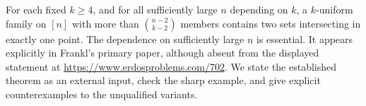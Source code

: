 For each fixed \(k\geq4\), and for all sufficiently large \(n\)
depending on \(k\), a \(k\)-uniform family on \([n]\) with more
than \(\binom{n-2}{k-2}\) members contains two sets intersecting
in exactly one point. The dependence on sufficiently large
\(n\) is essential. It appears explicitly in Frankl's primary
paper, although absent from the displayed statement at
\url{https://www.erdosproblems.com/702}.
We state the established theorem as an external input, check
the sharp example, and give explicit counterexamples to the
unqualified variants.
